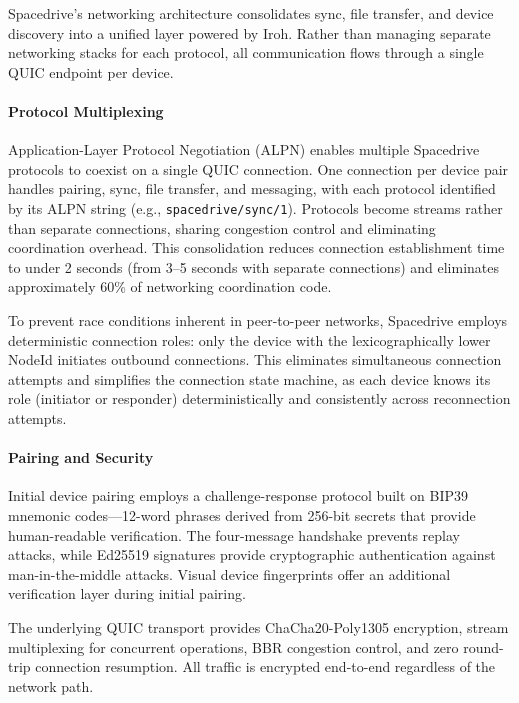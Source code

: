 \documentclass[sigconf]{acmart}
\begin{document}
Spacedrive's networking architecture consolidates sync, file transfer, and device discovery into a unified layer powered by Iroh. Rather than managing separate networking stacks for each protocol, all communication flows through a single QUIC endpoint per device.

\paragraph{Protocol Multiplexing}

Application-Layer Protocol Negotiation (ALPN) enables multiple Spacedrive protocols to coexist on a single QUIC connection. One connection per device pair handles pairing, sync, file transfer, and messaging, with each protocol identified by its ALPN string (e.g., \texttt{spacedrive/sync/1}). Protocols become streams rather than separate connections, sharing congestion control and eliminating coordination overhead. This consolidation reduces connection establishment time to under 2 seconds (from 3--5 seconds with separate connections) and eliminates approximately 60\% of networking coordination code.

To prevent race conditions inherent in peer-to-peer networks, Spacedrive employs deterministic connection roles: only the device with the lexicographically lower NodeId initiates outbound connections. This eliminates simultaneous connection attempts and simplifies the connection state machine, as each device knows its role (initiator or responder) deterministically and consistently across reconnection attempts.

\paragraph{Pairing and Security}

Initial device pairing employs a challenge-response protocol built on BIP39 mnemonic codes---12-word phrases derived from 256-bit secrets that provide human-readable verification. The four-message handshake prevents replay attacks, while Ed25519 signatures provide cryptographic authentication against man-in-the-middle attacks. Visual device fingerprints offer an additional verification layer during initial pairing.

The underlying QUIC transport provides ChaCha20-Poly1305 encryption, stream multiplexing for concurrent operations, BBR congestion control, and zero round-trip connection resumption. All traffic is encrypted end-to-end regardless of the network path.
\end{document}
